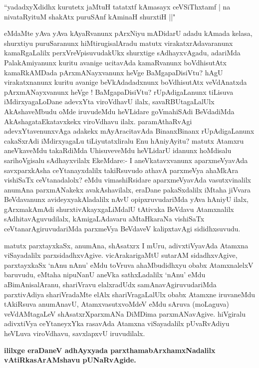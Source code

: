 \begin{shl}
``yadadxyXdidhx kurutetx jaMtuH tatatxtf kAmasayx ceVSiThxtamf |
na nivataRyituM shakAtx puruSAnf kAminaH shurxtiH ||"
\end{shl}

\begin{artha}
eMdaMte yAva yAva kAyaRvanunx pArxNiyu mADidarU adadu \break kAmada kelasa,
shurxtiyu puruSaranunx hiMtirugisalAradu matutx virakatxrAdavaranunx
kamaRgaLalilx perxVreVpisuvudakUkx shurxtige sAdhayxvAgadu, adariMda
PalakAmiyanunx kuritu avanige ucitavAda kamaRvanunx boVdhisutAtx
kamaRkAMDada pArxmANayx\-vanunx heVge BaMgapaDisiVtu? hAgU virakatxnanunx
kuritu avanige beVkAdadadxnunx boVdhisutAtx veVdAnatxda pArxmANayxvanunx
heVge ! BaMgapaDisiVtu? rUpAdi\-gaLanunx tiLisuva iMdirxyagaLoDane
adevxYta viroVdhavU ilalx, savaRBUtagaLalUlx AkAsha\-veMbudu
oMde iruvudeMdu heVLidare goVmahiSAdi BeVdadiMda AkAshagata\-Ekatavxkekx
viroVdhavu ilalx. paramAthaRvAgi adevxYtavenunxvAga adakekx
mAyAracita\-vAda BinanxBinanx rUpAdigaLanunx cakaSxrAdi iMdirxyagaLu
tiLiyutatxliralu Enu hAniyAyitu? matutx Atamxru aneVkaveMdu
takaRdiMda UhisuveveMdu heVLidarU idanunx hoMdisalu sarihoVgisalu
sAdhayxvilalx EkeMdare:- I aneVkatavxvanunx aparxmeVyavAda
savxparxkAsha ceYtanayxdalilx takiRsuvudo athavA parxmeVya ahaMkAra
vishiSaTx ceVtanadalolx? eMdu vimashiRsidare aparxmeVyavAda
vasutxvinalilx anumAna parxmANakekx avakAshavilalx, eraDane
pakaSxdalilx iMtaha jiVvara BeVdavanunx avideyxyakAladalilx nAvU
opipxruvudariMda yAva hAniyU ilalx, gArxmakAmAdi shurxtivAkayxgaLiMdalU
tAtivxka BeVdavu Atamxnalilx sAdhitavAguvudilalx, kAmigaLAdavaru
aMtaHkaraNa vishiSaTx ceVtanarAgiruvudariMda parxmeVya BeVdaveV
kalipxtavAgi sididhxsuvudu.

matutx parxtayxkaSx, anumAna, shAsatxrx I mUru, adivxtiVyavAda Atamxna
viSayadalilx parxsidadhxvAgive. vicArakarigaMtU sutarAM sidadhxvAgive,
parxtayxkaSx `nAnu nAnu' eMdu toVruva ahaMbudidhxyu obabx AtamxnalelxV
baruvudu, eMtaha nipuNanU aneVka sathxLadalilx `nAnu' eMdu
aBimAnisalAranu, shariVravu elalxradUdx samAnavAgiruvudariMda
parxtivAdiya shariVradaMte elAlx shariVragaLalUlx obabx Atamxne
iruvaneMdu tAkiRsuva anumAnavU, AtamxvasutxvoMdeV eMdu sAruva
(moLaguva) veVdAMtagaLeV shAsatxrXparxmANa DiMDima
parxmANavAgive. hiVgiralu adivxtiVya ceYtaneyxYka rasavAda Atamxna
viSayadalilx pUvaRvAdiyu heVLuva viroVdhavu, savxlapxvU iruvudilalx.
\end{artha}

\begin{center}
\textbf{ililxge eraDaneV adhAyxyada parxthamabArxhamxNadalilx vAtiRkasArAMshavu pUNaRvAgide.}
\end{center}

